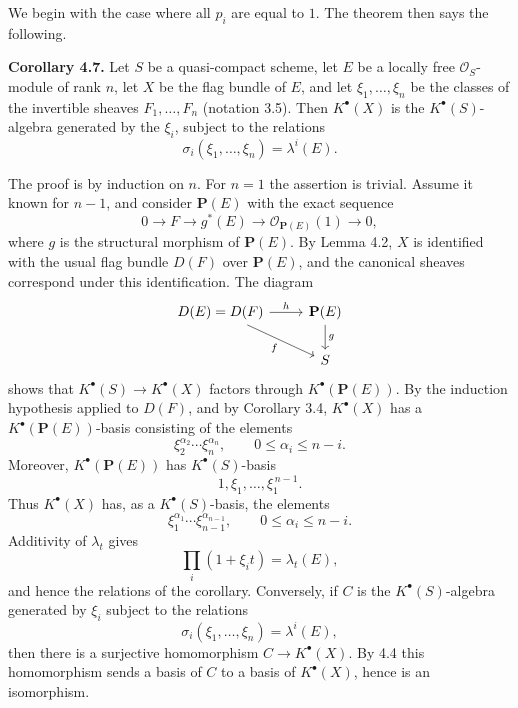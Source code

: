 \documentclass[11pt]{article}
\begin{document}
We begin with the case where all \(p_i\) are equal to \(1\). The theorem then says the following.

\textbf{Corollary 4.7.} Let \(S\) be a quasi-compact scheme, let \(E\) be a locally free \(\mathcal O_S\)-module of rank \(n\), let \(X\) be the flag bundle of \(E\), and let \(\xi_1,\ldots,\xi_n\) be the classes of the invertible sheaves \(F_1,\ldots,F_n\) (notation 3.5). Then \(K^\bullet(X)\) is the \(K^\bullet(S)\)-algebra generated by the \(\xi_i\), subject to the relations
\[
  \sigma_i(\xi_1,\ldots,\xi_n)=\lambda^i(E).
\]

The proof is by induction on \(n\). For \(n=1\) the assertion is trivial. Assume it known for \(n-1\), and consider \(\mathbf P(E)\) with the exact sequence
\[
  0\longrightarrow F\longrightarrow g^*(E)\longrightarrow \mathcal O_{\mathbf P(E)}(1)\longrightarrow 0,
\]
where \(g\) is the structural morphism of \(\mathbf P(E)\). By Lemma 4.2, \(X\) is identified with the usual flag bundle \(D(F)\) over \(\mathbf P(E)\), and the canonical sheaves correspond under this identification. The diagram
\[
\begin{tikzcd}
D(E)=D(F) \arrow[r,"h"] \arrow[dr,"f"'] & \mathbf P(E) \arrow[d,"g"]\\
& S
\end{tikzcd}
\]
shows that \(K^\bullet(S)\to K^\bullet(X)\) factors through \(K^\bullet(\mathbf P(E))\). By the induction hypothesis applied to \(D(F)\), and by Corollary 3.4, \(K^\bullet(X)\) has a \(K^\bullet(\mathbf P(E))\)-basis consisting of the elements
\[
  \xi_2^{\alpha_2}\cdots \xi_n^{\alpha_n},
  \qquad 0\leq\alpha_i\leq n-i .
\]
Moreover, \(K^\bullet(\mathbf P(E))\) has \(K^\bullet(S)\)-basis
\[
  1,\xi_1,\ldots,\xi_1^{\,n-1}.
\]
Thus \(K^\bullet(X)\) has, as a \(K^\bullet(S)\)-basis, the elements
\[
  \xi_1^{\alpha_1}\cdots\xi_{n-1}^{\alpha_{n-1}},
  \qquad 0\leq \alpha_i\leq n-i.
\]
Additivity of \(\lambda_t\) gives
\[
  \prod_i(1+\xi_i t)=\lambda_t(E),
\]
and hence the relations of the corollary. Conversely, if \(C\) is the \(K^\bullet(S)\)-algebra generated by \(\xi_i\) subject to the relations
\[
  \sigma_i(\xi_1,\ldots,\xi_n)=\lambda^i(E),
\]
then there is a surjective homomorphism \(C\to K^\bullet(X)\). By 4.4 this homomorphism sends a basis of \(C\) to a basis of \(K^\bullet(X)\), hence is an isomorphism.
\end{document}
